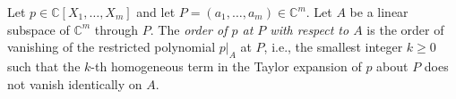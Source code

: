 Let $p \in \mathbb{C}[X_1, \ldots, X_m]$ and let $P = (a_1, \ldots, a_m) \in \mathbb{C}^m$. Let $A$ be a linear subspace of $\mathbb{C}^m$ through $P$. The \textit{order of $p$ at $P$ with respect to $A$} is the order of vanishing of the restricted polynomial $p|_A$ at $P$, i.e., the smallest integer $k \geq 0$ such that the $k$-th homogeneous term in the Taylor expansion of $p$ about $P$ does not vanish identically on $A$.
